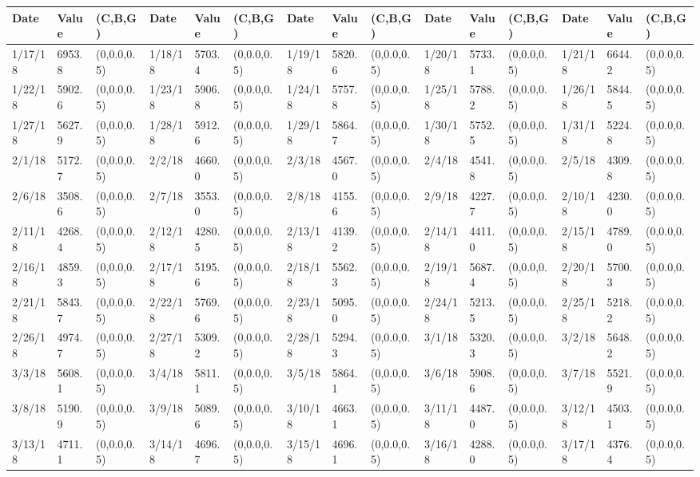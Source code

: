 \documentclass[12pt]{article}
\begin{document}
    \begin{table}
        \tiny
        \begin{center}
        \begin{tabular}{p{15pt}p{15pt}p{25pt}p{15pt}p{15pt}p{25pt}p{15pt}p{15pt}p{25pt}p{15pt}p{15pt}p{25pt}p{15pt}p{15pt}p{25pt}}
        \toprule
        Date & Value&(C,B,G)&Date & Value&(C,B,G)&Date & Value&(C,B,G)&Date & Value&(C,B,G)&Date & Value&(C,B,G)\\
        \midrule
        1/17/18&6953.8&(0,0.0,0.5)&1/18/18&5703.4&(0,0.0,0.5)&1/19/18&5820.6&(0,0.0,0.5)&1/20/18&5733.1&(0,0.0,0.5)&1/21/18&6644.2&(0,0.0,0.5)\\
        1/22/18&5902.6&(0,0.0,0.5)&1/23/18&5906.8&(0,0.0,0.5)&1/24/18&5757.8&(0,0.0,0.5)&1/25/18&5788.2&(0,0.0,0.5)&1/26/18&5844.5&(0,0.0,0.5)\\
        1/27/18&5627.9&(0,0.0,0.5)&1/28/18&5912.6&(0,0.0,0.5)&1/29/18&5864.7&(0,0.0,0.5)&1/30/18&5752.5&(0,0.0,0.5)&1/31/18&5224.8&(0,0.0,0.5)\\
        2/1/18&5172.7&(0,0.0,0.5)&2/2/18&4660.0&(0,0.0,0.5)&2/3/18&4567.0&(0,0.0,0.5)&2/4/18&4541.8&(0,0.0,0.5)&2/5/18&4309.8&(0,0.0,0.5)\\
        2/6/18&3508.6&(0,0.0,0.5)&2/7/18&3553.0&(0,0.0,0.5)&2/8/18&4155.6&(0,0.0,0.5)&2/9/18&4227.7&(0,0.0,0.5)&2/10/18&4230.0&(0,0.0,0.5)\\
        2/11/18&4268.4&(0,0.0,0.5)&2/12/18&4280.5&(0,0.0,0.5)&2/13/18&4139.2&(0,0.0,0.5)&2/14/18&4411.0&(0,0.0,0.5)&2/15/18&4789.0&(0,0.0,0.5)\\
        2/16/18&4859.3&(0,0.0,0.5)&2/17/18&5195.6&(0,0.0,0.5)&2/18/18&5562.3&(0,0.0,0.5)&2/19/18&5687.4&(0,0.0,0.5)&2/20/18&5700.3&(0,0.0,0.5)\\
        2/21/18&5843.7&(0,0.0,0.5)&2/22/18&5769.6&(0,0.0,0.5)&2/23/18&5095.0&(0,0.0,0.5)&2/24/18&5213.5&(0,0.0,0.5)&2/25/18&5218.2&(0,0.0,0.5)\\
        2/26/18&4974.7&(0,0.0,0.5)&2/27/18&5309.2&(0,0.0,0.5)&2/28/18&5294.3&(0,0.0,0.5)&3/1/18&5320.3&(0,0.0,0.5)&3/2/18&5648.2&(0,0.0,0.5)\\
        3/3/18&5608.1&(0,0.0,0.5)&3/4/18&5811.1&(0,0.0,0.5)&3/5/18&5864.1&(0,0.0,0.5)&3/6/18&5908.6&(0,0.0,0.5)&3/7/18&5521.9&(0,0.0,0.5)\\
        3/8/18&5190.9&(0,0.0,0.5)&3/9/18&5089.6&(0,0.0,0.5)&3/10/18&4663.1&(0,0.0,0.5)&3/11/18&4487.0&(0,0.0,0.5)&3/12/18&4503.1&(0,0.0,0.5)\\
        3/13/18&4711.1&(0,0.0,0.5)&3/14/18&4696.7&(0,0.0,0.5)&3/15/18&4696.1&(0,0.0,0.5)&3/16/18&4288.0&(0,0.0,0.5)&3/17/18&4376.4&(0,0.0,0.5)\\

\end{tabular}
\end{center}
\end{table}
\end{document}
